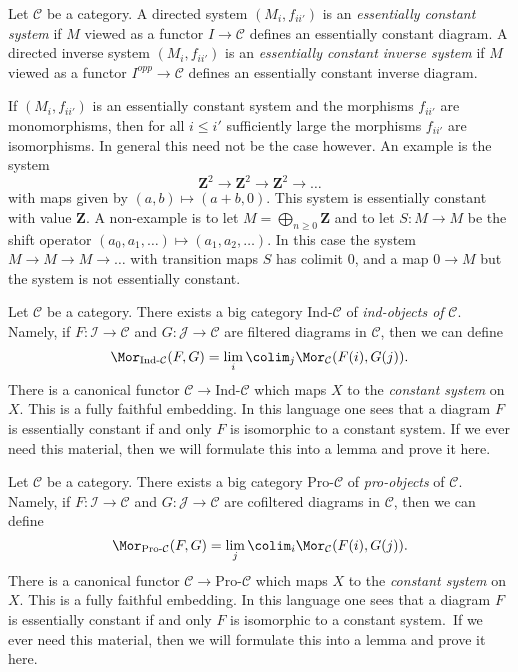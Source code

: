 \begin{definition}
\label{definition-essentially-constant-system}
Let $\mathcal{C}$ be a category. A directed system
$(M_i, f_{ii'})$ is an {\it essentially constant system}
if $M$ viewed as a functor $I \to \mathcal{C}$
defines an essentially constant diagram. A directed inverse system
$(M_i, f_{ii'})$ is an {\it essentially constant inverse system} if
$M$ viewed as a functor $I^{opp} \to \mathcal{C}$ defines an
essentially constant inverse diagram.
\end{definition}

\noindent
If $(M_i, f_{ii'})$ is an essentially constant system and the morphisms
$f_{ii'}$ are monomorphisms, then for all $i \leq i'$ sufficiently large the
morphisms $f_{ii'}$ are isomorphisms. In general this need not be the
case however. An example is the system
$$
\mathbf{Z}^2 \to \mathbf{Z}^2 \to \mathbf{Z}^2 \to \ldots
$$
with maps given by $(a, b) \mapsto (a + b, 0)$. This system is essentially
constant with value $\mathbf{Z}$. A non-example is to let
$M = \bigoplus_{n \geq 0} \mathbf{Z}$ and to let $S : M \to M$ be the
shift operator $(a_0, a_1, \ldots) \mapsto (a_1, a_2, \ldots)$. In this
case the system $M \to M \to M \to \ldots$ with transition maps $S$
has colimit $0$, and a map $0 \to M$ but the system is not essentially
constant.

\begin{remark}
\label{remark-ind-category}
Let $\mathcal{C}$ be a category. There exists a big category
$\text{Ind-}\mathcal{C}$ of {\it ind-objects of} $\mathcal{C}$.
Namely, if $F : \mathcal{I} \to \mathcal{C}$ and
$G : \mathcal{J} \to \mathcal{C}$ are filtered diagrams in $\mathcal{C}$,
then we can define
$$
\Mor_{\text{Ind-}\mathcal{C}}(F, G) =
\lim_i \colim_j \Mor_\mathcal{C}(F(i), G(j)).
$$
There is a canonical functor $\mathcal{C} \to \text{Ind-}\mathcal{C}$
which maps $X$ to the {\it constant system} on $X$. This is a fully
faithful embedding. In this language one sees that a diagram $F$ is
essentially constant if and only $F$ is isomorphic to a constant system.
If we ever need this material, then we will formulate this into a lemma
and prove it here.
\end{remark}

\begin{remark}
\label{remark-pro-category}
Let $\mathcal{C}$ be a category. There exists a big category
$\text{Pro-}\mathcal{C}$ of {\it pro-objects} of $\mathcal{C}$.
Namely, if $F : \mathcal{I} \to \mathcal{C}$ and
$G : \mathcal{J} \to \mathcal{C}$ are cofiltered diagrams in $\mathcal{C}$,
then we can define
$$
\Mor_{\text{Pro-}\mathcal{C}}(F, G) =
\lim_j \colim_i \Mor_\mathcal{C}(F(i), G(j)).
$$
There is a canonical functor $\mathcal{C} \to \text{Pro-}\mathcal{C}$
which maps $X$ to the {\it constant system} on $X$. This is a fully
faithful embedding. In this language one sees that a diagram $F$ is
essentially constant if and only $F$ is isomorphic to a constant system.\
If we ever need this material, then we will formulate this into a lemma
and prove it here.
\end{remark}

